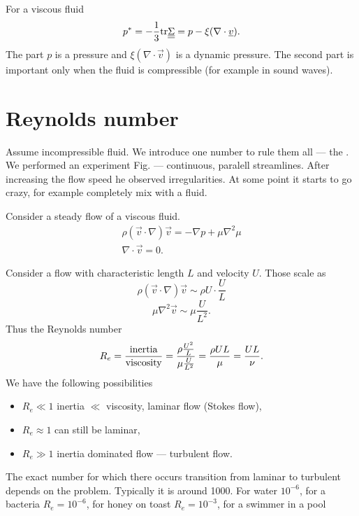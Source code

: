 \documentclass[../main.tex]{subfiles}
\begin{document}
    For a viscous fluid
    \begin{displaymath}
      p^* = - \frac{1}{3} \textrm{tr} \underline{\underline{{\Sigma}}} = p - \xi(\nabla \cdot \underline{v}).
    \end{displaymath}
    The part $p$ is a pressure and $\xi (\nabla \cdot \vec v) $ is a dynamic pressure.
    The second part is important only when the fluid is compressible (for example in sound waves).

    \section{Reynolds number}
    Assume incompressible fluid.
    We introduce one number to rule them all --- the .
    We performed an experiment \todo Fig.
     --- continuous, paralell streamlines.
    After increasing the flow speed he observed irregularities.
    At some point it starts to go crazy, for example completely mix with a fluid.

    Consider a steady flow of a viscous fluid.
    \begin{align*}
      \rho(\vec v \cdot \nabla) \vec v = - \nabla p + \mu \nabla^2 \mu\\
      \nabla \cdot \vec v = 0.
    \end{align*}

    Consider a flow with characteristic length $L$ and velocity $U$.
    Those scale as
    \begin{displaymath}
      \rho( \vec v \cdot \nabla) \vec v \sim \rho U \cdot \frac{U}{L}
    \end{displaymath}
    \begin{displaymath}
      \mu \nabla^2 \vec v \sim \mu \frac{U}{L^2}.
    \end{displaymath}
    Thus the Reynolds number 
    \begin{displaymath}
      R_e = \frac{\textrm{inertia}}{\textrm{viscosity}} 
      = \frac{\rho \frac{U^2}{L}}{\mu \frac{U}{L^2}} 
      = \frac{\rho UL}{\mu}
      = \frac{UL}{\nu}.
    \end{displaymath}
    We have the following possibilities
    \begin{itemize}
      \item $R_e \ll 1$ inertia $\ll$ viscosity, laminar flow (Stokes flow),
      \item $R_e \approx 1$ can still be laminar,
      \item $R_e \gg 1$ inertia dominated flow --- turbulent flow.
    \end{itemize}
    The exact number for which there occurs transition from laminar to turbulent depends on the problem.
    Typically it is around 1000.
    For water $10^{-6}$, for a bacteria $R_e = 10^{-6}$, for honey on toast $R_e = 10^{-3}$, 
    for a swimmer in a pool
\end{document}
